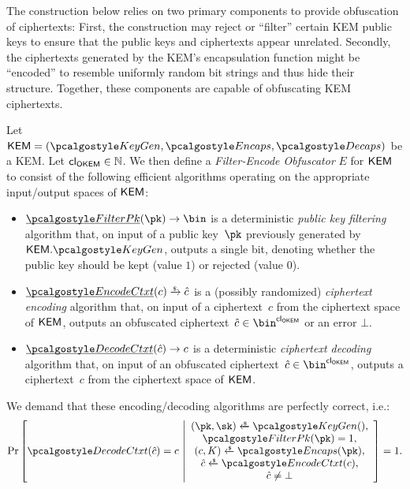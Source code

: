 The construction below relies on two primary components to provide obfuscation of ciphertexts: First, the construction may reject or ``filter'' certain KEM public keys to ensure that the public keys and ciphertexts appear unrelated. Secondly, the ciphertexts generated by the KEM's encapsulation function might be ``encoded'' to resemble uniformly random bit strings and thus hide their structure. Together, these components are capable of obfuscating KEM ciphertexts.

\begin{definition}
\label{def:filter-encode-obfs}
    Let $\KEM = (\kgen, \encaps, \decaps)$ be a KEM.
    Let ${\mathsf{cl}_{\mathsf{OKEM}}} \in \mathbb N$.
    We then define a \emph{Filter-Encode Obfuscator} $E$ for $\mathsf{KEM}$ to consist of the following efficient algorithms operating on the appropriate input/output spaces of $\mathsf{KEM}$:
    \begin{itemize}
        \item $\ul{\filterpk}(\pk) \to \bin$
        is a deterministic \emph{public key filtering} algorithm that, on input of a public key~$\pk$ previously generated by $\KEM.\kgen$, outputs a single bit, denoting whether the public key should be kept (value $1$) or rejected (value $0$).
        \item $\ul{\encodectxt}(c) \tor \hat c$
        is a (possibly randomized) \emph{ciphertext encoding} algorithm that, on input of a ciphertext~$c$ from the ciphertext space of $\mathsf{KEM}$, outputs an obfuscated ciphertext~$\hat c \in \bin^{\obfctxtlen}$ or an error $\bot$.
        \item $\ul{\decodectxt}(\hat c) \to c$
        is a deterministic \emph{ciphertext decoding} algorithm that, on input of an obfuscated ciphertext~$\hat c \in \bin^{\obfctxtlen}$, outputs a ciphertext~$c$ from the ciphertext space of $\mathsf{KEM}$.
    \end{itemize}

    We demand that these encoding/decoding algorithms are perfectly correct, i.e.:
    \[
        \Pr\left[
            \decodectxt(\hat c) = c
        ~\middle|
            \begin{array}{c}
                (\pk, \sk) \getsr \kgen(),\\
                \filterpk(\pk) = 1, \\
                (c, K) \getsr \encaps(\pk),\\
                \hat c \getsr \encodectxt(c),\\
                \hat c \neq \bot
            \end{array}
        \right] = 1.
    \]
\end{definition}

